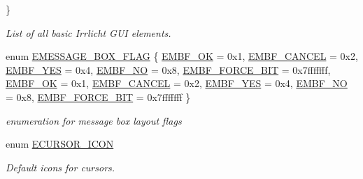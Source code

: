 \begin{DoxyCompactItemize}
 \}\begin{DoxyCompactList}\small\item\em List of all basic Irrlicht G\+UI elements. \end{DoxyCompactList}
\item 
enum \hyperlink{namespaceirr_1_1gui_af55112e55731c9ad1b9fe9b372c521af}{E\+M\+E\+S\+S\+A\+G\+E\+\_\+\+B\+O\+X\+\_\+\+F\+L\+AG} \{ \newline
\hyperlink{namespaceirr_1_1gui_af55112e55731c9ad1b9fe9b372c521afa9660280349027f678b2315a15a23ba0e}{E\+M\+B\+F\+\_\+\+OK} = 0x1, 
\hyperlink{namespaceirr_1_1gui_af55112e55731c9ad1b9fe9b372c521afa4c6c6d37767c4caa272cb093b6e583ce}{E\+M\+B\+F\+\_\+\+C\+A\+N\+C\+EL} = 0x2, 
\hyperlink{namespaceirr_1_1gui_af55112e55731c9ad1b9fe9b372c521afad3740fa48d62f71940a3189c863aefb4}{E\+M\+B\+F\+\_\+\+Y\+ES} = 0x4, 
\hyperlink{namespaceirr_1_1gui_af55112e55731c9ad1b9fe9b372c521afa9c9d2e9cb44798f01cb4c25fd10d2f02}{E\+M\+B\+F\+\_\+\+NO} = 0x8, 
\newline
\hyperlink{namespaceirr_1_1gui_af55112e55731c9ad1b9fe9b372c521afaab935b4e63cc341d257a1a7d36a61f71}{E\+M\+B\+F\+\_\+\+F\+O\+R\+C\+E\+\_\+B\+IT} = 0x7fffffff, 
\hyperlink{namespaceirr_1_1gui_af55112e55731c9ad1b9fe9b372c521afa9660280349027f678b2315a15a23ba0e}{E\+M\+B\+F\+\_\+\+OK} = 0x1, 
\hyperlink{namespaceirr_1_1gui_af55112e55731c9ad1b9fe9b372c521afa4c6c6d37767c4caa272cb093b6e583ce}{E\+M\+B\+F\+\_\+\+C\+A\+N\+C\+EL} = 0x2, 
\hyperlink{namespaceirr_1_1gui_af55112e55731c9ad1b9fe9b372c521afad3740fa48d62f71940a3189c863aefb4}{E\+M\+B\+F\+\_\+\+Y\+ES} = 0x4, 
\newline
\hyperlink{namespaceirr_1_1gui_af55112e55731c9ad1b9fe9b372c521afa9c9d2e9cb44798f01cb4c25fd10d2f02}{E\+M\+B\+F\+\_\+\+NO} = 0x8, 
\hyperlink{namespaceirr_1_1gui_af55112e55731c9ad1b9fe9b372c521afaab935b4e63cc341d257a1a7d36a61f71}{E\+M\+B\+F\+\_\+\+F\+O\+R\+C\+E\+\_\+B\+IT} = 0x7fffffff
 \}\begin{DoxyCompactList}\small\item\em enumeration for message box layout flags \end{DoxyCompactList}
\item 
\mbox{\label{namespaceirr_1_1gui_aefee802dd632c5735703e40ef40f879b}} 
enum \hyperlink{namespaceirr_1_1gui_aefee802dd632c5735703e40ef40f879b}{E\+C\+U\+R\+S\+O\+R\+\_\+\+I\+C\+ON} \begin{DoxyCompactList}\small\item\em Default icons for cursors. \end{DoxyCompactList}

\end{DoxyCompactItemize}
